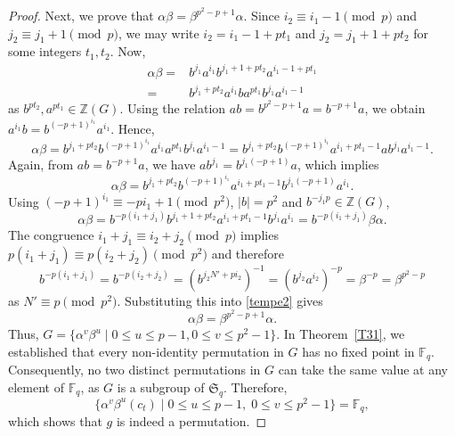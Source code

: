 \documentclass[10pt,a4paper]{amsart}
\begin{document}
\begin{proof}
Next, we prove that $\alpha \beta=\beta^{p^2-p+1}\alpha$. Since $i_2\equiv i_1-1 \pmod  p$ and $j_2 \equiv j_1+1 \pmod  p$, we may write $i_2=i_1-1+pt_1$ and $j_2=j_1+1+pt_2$ for some integers $t_1,t_2$. Now,
  \[
  \begin{aligned}
  \alpha \beta=&b^{j_1}a^{i_1}b^{j_1+1+pt_2}a^{i_1-1+pt_1}
  \\=&b^{j_1+pt_2}a^{i_1}ba^{pt_1}b^{j_1}a^{i_1-1}
    \end{aligned}
  \]
 as $b^{pt_2},a^{pt_1} \in \mathbb{Z}(G)$. Using the relation $ab=b^{p^2-p+1}a=b^{-p+1}a$, we obtain $a^{i_1}b=b^{(-p+1)^{i_1}}a^{i_1}$. Hence, 
 \[
 \alpha \beta=b^{j_1+pt_2}b^{(-p+1)^{i_1}}a^{i_1}a^{pt_1}b^{j_1}a^{i_1-1}=b^{j_1+pt_2}b^{(-p+1)^{i_1}}a^{i_1+pt_1-1}ab^{j_1}a^{i_1-1}.
 \]
 Again, from $ab=b^{-p+1}a$, we have $ab^{j_1}=b^{j_1(-p+1)}a$, which implies 
 \begin{equation*}
     \alpha \beta=b^{j_1+pt_2}b^{(-p+1)^{i_1}}a^{i_1+pt_1-1}b^{j_1(-p+1)}a^{i_1}.
 \end{equation*}
 Using $(-p+1)^{i_1} \equiv -pi_1+1 \pmod {p^2}$, $|b|=p^2$ and $b^{-j_1p} \in \mathbb{Z}(G)$,
\begin{equation}\label{tempe2}
     \alpha \beta=b^{-p(i_1+j_1)}b^{j_1+1+pt_2}a^{i_1+pt_1-1}b^{j_1}a^{i_1}=b^{-p(i_1+j_1)}\beta \alpha.
 \end{equation}
 The congruence  $i_1+j_1 \equiv i_2+j_2 \pmod  p$ implies $p(i_1+j_1) \equiv p(i_2+j_2) \pmod {p^2}$ and therefore $$b^{-p(i_1+j_1)}=b^{-p(i_2+j_2)}=(b^{j_2N'+pi_2})^{-1}=(b^{j_2}a^{i_2})^{-p}=\beta^{-p}=\beta^{p^2-p}$$ as $N'\equiv p \pmod {p^2}$. Substituting this into \eqref{tempe2} gives $$\alpha \beta=\beta^{p^2-p+1}\alpha.$$ Thus, $G=\{\alpha^{v}\beta^{u} \mid 0 \leq u \leq p-1, 0 \leq v \leq p^2-1\}$. In Theorem~\ref{T31}, we established that every non-identity permutation in $G$
has no fixed point in $\mathbb{F}_q$. Consequently, no two distinct
permutations in $G$ can take the same value at any element of $\mathbb{F}_q$,
as $G$ is a subgroup of $\mathfrak{S}_q$. Therefore,
\[
\{\alpha^{v}\beta^{u}(c_t)\mid 0 \le u \le p-1,\; 0 \le v \le p^{2}-1\}
 = \mathbb{F}_q,
\]
which shows that $g$ is indeed a permutation.

 
 

\end{proof}
\end{document}
